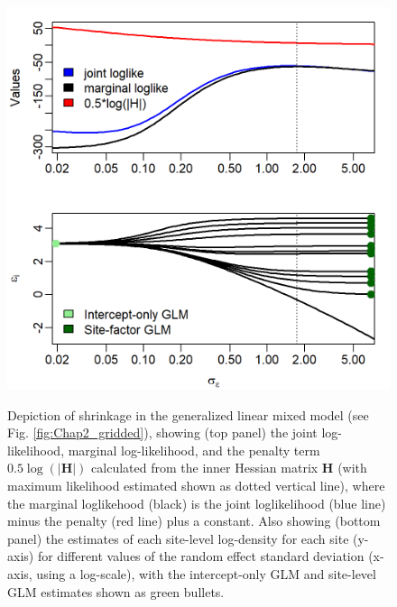 \begin{figure}[!ht]
    \caption[Illustrating shrinkage in a generalized linear mixed model]{Depiction of shrinkage in the generalized linear mixed model (see Fig. \ref{fig:Chap2_gridded}), showing (top panel) the joint log-likelihood, marginal log-likelihood, and the penalty term \(0.5\log(|\mathbf{H}|)\) calculated from the inner Hessian matrix \(\mathbf{H}\) (with maximum likelihood estimated shown as dotted vertical line), where the marginal loglikehood (black) is the joint loglikelihood (blue line) minus the penalty (red line) plus a constant. Also showing (bottom panel) the estimates of each site-level log-density for each site (y-axis) for different values of the random effect standard deviation (x-axis, using a log-scale), with the intercept-only GLM and site-level GLM estimates shown as green bullets.}
    \centering
    \includegraphics[width=5.5in]{Chap_2/Shrinkage.png}
    \label{fig:Chap2_shrinkage}
\end{figure}

